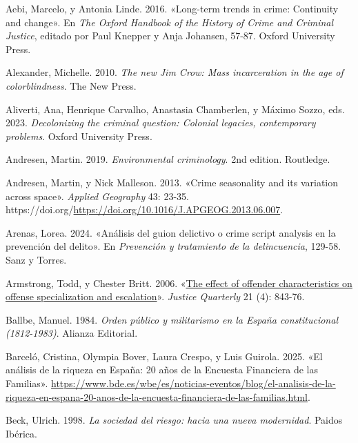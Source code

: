 \documentclass[
  spanish,
  letterpaper,
  DIV=11,
  numbers=noendperiod]{scrreprt}
\newlength{\cslhangindent}
\newenvironment{CSLReferences}[2] %
 {\begin{list}{}{%
  \setlength{\itemindent}{0pt}
  \setlength{\leftmargin}{0pt}
  \setlength{\parsep}{0pt}
  \ifodd #1
   \setlength{\leftmargin}{\cslhangindent}
   \setlength{\itemindent}{-1\cslhangindent}
  \fi
  \setlength{\itemsep}{#2\baselineskip}}}
 {\end{list}}
\begin{document}
\label{refs}
\begin{CSLReferences}{1}{0}
Aebi, Marcelo, y Antonia Linde. 2016. {«Long-term trends in crime:
Continuity and change»}. En \emph{The Oxford Handbook of the History of
Crime and Criminal Justice}, editado por Paul Knepper y Anja Johansen,
57-87. Oxford University Press.

Alexander, Michelle. 2010. \emph{The new Jim Crow: Mass incarceration in
the age of colorblindness}. The New Press.

Aliverti, Ana, Henrique Carvalho, Anastasia Chamberlen, y Máximo Sozzo,
eds. 2023. \emph{Decolonizing the criminal question: Colonial legacies,
contemporary problems}. Oxford University Press.

Andresen, Martin. 2019. \emph{Environmental criminology}. 2nd edition.
Routledge.

Andresen, Martin, y Nick Malleson. 2013. {«Crime seasonality and its
variation across space»}. \emph{Applied Geography} 43: 23-35.
https://doi.org/\url{https://doi.org/10.1016/J.APGEOG.2013.06.007}.

Arenas, Lorea. 2024. {«Análisis del guion delictivo o crime script
analysis en la prevención del delito»}. En \emph{Prevención y
tratamiento de la delincuencia}, 129-58. Sanz y Torres.

Armstrong, Todd, y Chester Britt. 2006. {«\href{}{The effect of offender
characteristics on offense specialization and escalation}»}.
\emph{Justice Quarterly} 21 (4): 843-76.

Ballbe, Manuel. 1984. \emph{Orden público y militarismo en la España
constitucional (1812-1983)}. Alianza Editorial.

Barceló, Cristina, Olympia Bover, Laura Crespo, y Luis Guirola. 2025.
{«El análisis de la riqueza en España: 20 años de la Encuesta Financiera
de las Familias»}.
\url{https://www.bde.es/wbe/es/noticias-eventos/blog/el-analisis-de-la-riqueza-en-espana-20-anos-de-la-encuesta-financiera-de-las-familias.html}.

Beck, Ulrich. 1998. \emph{La sociedad del riesgo: hacia una nueva
modernidad}. Paidos Ibérica.


\end{CSLReferences}
\end{document}
